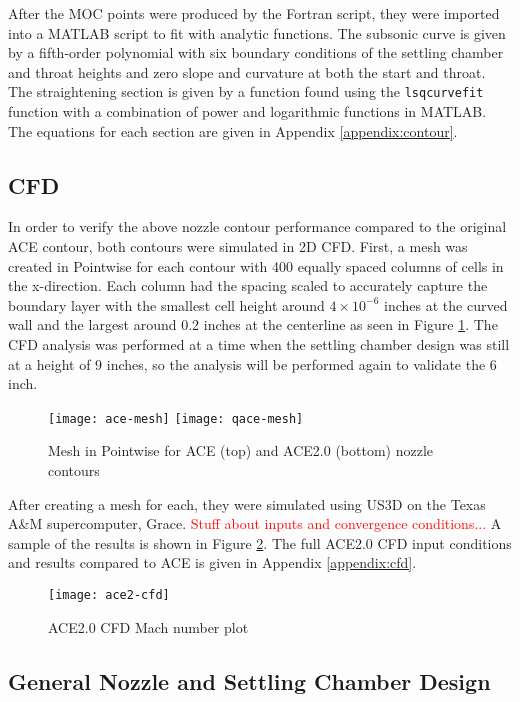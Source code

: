 After the MOC points were produced by the Fortran script, they were imported into a MATLAB script to fit with analytic functions. The subsonic curve is given by a fifth-order polynomial with six boundary conditions of the settling chamber and throat heights and zero slope and curvature at both the start and throat. The straightening section is given by a function found using the \texttt{lsqcurvefit} function with a combination of power and logarithmic functions in MATLAB. The equations for each section are given in Appendix \ref{appendix:contour}.

\subsection{CFD}

In order to verify the above nozzle contour performance compared to the original ACE contour, both contours were simulated in 2D CFD. First, a mesh was created in Pointwise for each contour with 400 equally spaced columns of cells in the x-direction. Each column had the spacing scaled to accurately capture the boundary layer with the smallest cell height around $4 \times 10^{-6}$ inches at the curved wall and the largest around 0.2 inches at the centerline as seen in Figure \ref{fig:mesh}. The CFD analysis was performed at a time when the settling chamber design was still at a height of 9 inches, so the analysis will be performed again to validate the 6 inch.

\begin{figure}[ht!]
    \centering
    \texttt{[image: ace-mesh]}
    \texttt{[image: qace-mesh]}
    \caption{Mesh in Pointwise for ACE (top) and ACE2.0 (bottom) nozzle contours}
    \label{fig:mesh}
\end{figure}

After creating a mesh for each, they were simulated using US3D on the Texas A\&M supercomputer, Grace. \textcolor{red}{Stuff about inputs and convergence conditions...} A sample of the results is shown in Figure \ref{fig:ace2-cfd}. The full ACE2.0 CFD input conditions and results compared to ACE is given in Appendix \ref{appendix:cfd}.

\begin{figure}[ht!]
    \centering
    \texttt{[image: ace2-cfd]}
    \caption{ACE2.0 CFD Mach number plot}
    \label{fig:ace2-cfd}
\end{figure}

\subsection{General Nozzle and Settling Chamber Design}

